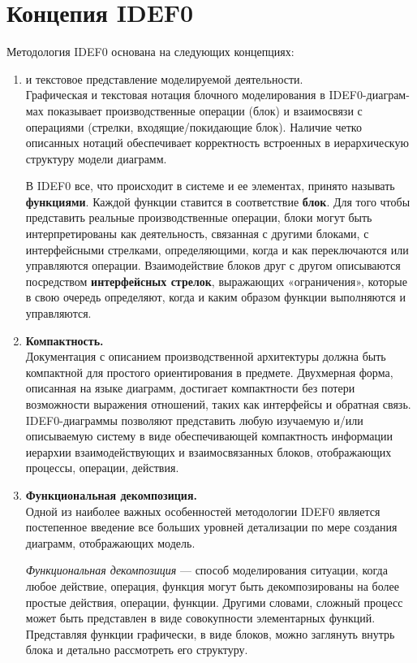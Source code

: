 \documentclass[a4paper, final]{article}
\begin{document}
\newpage
\section{Концепия IDEF0}
Методология IDEF0 основана на следующих концепциях:
\begin{enumerate}
	\item { и текстовое представление моделируемой деятельности.} \\
Графическая и текстовая нотация блочного моделирования в IDEF0-диаграм-мах показывает производственные операции 
(блок) и взаимосвязи с операциями (стрелки, входящие/покидающие блок). Наличие четко описанных нотаций обеспечивает 
корректность встроенных в иерархическую структуру модели диаграмм.

В IDEF0 все, что происходит в системе и ее элементах, принято называть {\bf функциями}. Каждой функции ставится в соответствие {\bf блок}. 
Для того чтобы представить реальные производственные операции, блоки могут быть интерпретированы как деятельность, связанная с другими блоками, 
с интерфейсными стрелками, определяющими, когда и как переключаются или управляются операции. Взаимодействие блоков друг с другом описываются 
посредством {\bf интерфейсных стрелок}, выражающих «ограничения», которые в свою очередь определяют, когда и каким образом функции выполняются и 
управляются.

	\item {\bf Компактность.} \\
Документация с описанием производственной архитектуры должна быть компактной для простого ориентирования в 
предмете. Двухмерная форма, описанная на языке диаграмм, достигает компактности без потери возможности выражения 
отношений, таких как интерфейсы и обратная связь. IDEF0-диаграммы позволяют представить любую изучаемую и/или 
описываемую систему в виде обеспечивающей компактность информации иерархии взаимодействующих и взаимосвязанных 
блоков, отображающих процессы, операции, действия.

	\item {\bf Функциональная декомпозиция.} \\
Одной из наиболее важных особенностей методологии IDEF0 является постепенное введение все больших 
уровней детализации по мере создания диаграмм, отображающих модель.

{\it Функциональная декомпозиция} --- способ моделирования ситуации, когда любое действие, операция, 
функция могут быть декомпозированы на более простые действия, операции, функции. Другими словами, сложный 
процесс может быть представлен в виде совокупности элементарных функций. Представляя функции графически, в 
виде блоков, можно заглянуть внутрь блока и детально рассмотреть его структуру.


\end{enumerate}
\end{document}
